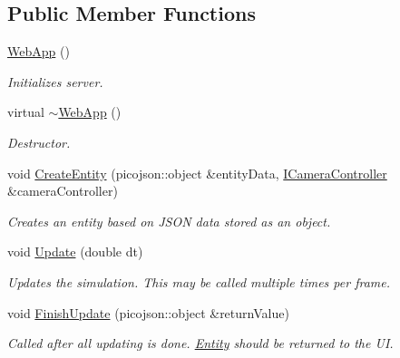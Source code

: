\subsection*{Public Member Functions}
\begin{DoxyCompactItemize}
\item 
\mbox{\label{classWebApp_a9ba424099f42bdd456f52c4bba87d5b2}} 
\hyperlink{classWebApp_a9ba424099f42bdd456f52c4bba87d5b2}{Web\+App} ()
\begin{DoxyCompactList}\small\item\em Initializes server. \end{DoxyCompactList}\item 
\mbox{\label{classWebApp_aea8764197ebbcd256a07055b187a7fa8}} 
virtual \hyperlink{classWebApp_aea8764197ebbcd256a07055b187a7fa8}{$\sim$\+Web\+App} ()
\begin{DoxyCompactList}\small\item\em Destructor. \end{DoxyCompactList}\item 
\mbox{\label{classWebApp_aa75704c331471269090aff776bf70c66}} 
void \hyperlink{classWebApp_aa75704c331471269090aff776bf70c66}{Create\+Entity} (picojson\+::object \&entity\+Data, \hyperlink{classICameraController}{I\+Camera\+Controller} \&camera\+Controller)
\begin{DoxyCompactList}\small\item\em Creates an entity based on J\+S\+ON data stored as an object. \end{DoxyCompactList}\item 
\mbox{\label{classWebApp_a422feda1eac97b1aa1f69243387498c2}} 
void \hyperlink{classWebApp_a422feda1eac97b1aa1f69243387498c2}{Update} (double dt)
\begin{DoxyCompactList}\small\item\em Updates the simulation. This may be called multiple times per frame. \end{DoxyCompactList}\item 
\mbox{\label{classWebApp_ac7731245815aefcff7023a4dd10995ea}} 
void \hyperlink{classWebApp_ac7731245815aefcff7023a4dd10995ea}{Finish\+Update} (picojson\+::object \&return\+Value)
\begin{DoxyCompactList}\small\item\em Called after all updating is done. \hyperlink{classEntity}{Entity} should be returned to the UI. \end{DoxyCompactList}\item 

\end{DoxyCompactItemize}
